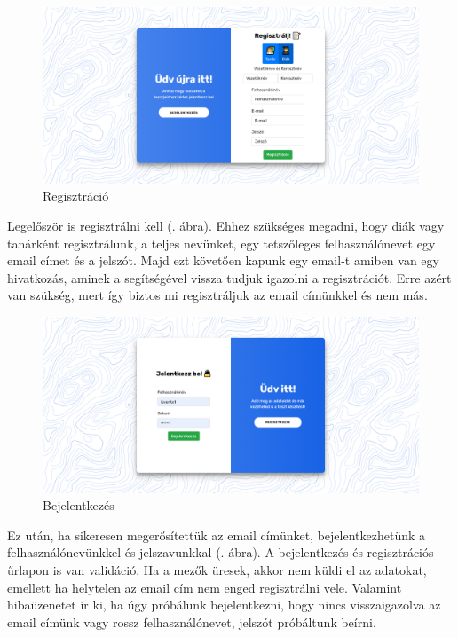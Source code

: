 \begin{figure}[h!]
    \centering
    \includegraphics[width=\linewidth]{images/signin.png}
    \caption{Regisztráció}
    \label{fig:signin}
\end{figure}

Legelőször is regisztrálni kell (. ábra). Ehhez szükséges megadni, hogy diák vagy tanárként regisztrálunk, a teljes nevünket, egy tetszőleges felhasználónevet egy email címet és a jelszót. Majd ezt követően kapunk egy email-t amiben van egy hivatkozás, aminek a segítségével vissza tudjuk igazolni a regisztrációt. Erre azért van szükség, mert így biztos mi regisztráljuk az email címünkkel és nem más.

\begin{figure}[h!]
    \centering
    \includegraphics[width=\linewidth]{images/login.png}
    \caption{Bejelentkezés}
    \label{fig:login}
\end{figure}

Ez után, ha sikeresen megerősítettük az email címünket, bejelentkezhetünk a felhasználónevünkkel és jelszavunkkal (. ábra).
A bejelentkezés és regisztrációs űrlapon is van validáció. Ha a mezők üresek, akkor nem küldi el az adatokat, emellett ha helytelen az email cím nem enged regisztrálni vele. Valamint hibaüzenetet ír ki, ha úgy próbálunk bejelentkezni, hogy nincs visszaigazolva az email címünk vagy rossz felhasználónevet, jelszót próbáltunk beírni.


